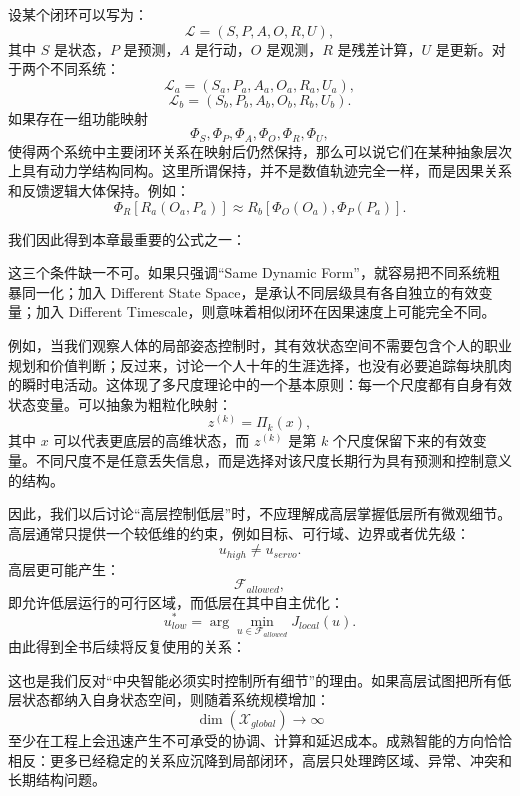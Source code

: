 设某个闭环可以写为：
\[
\mathcal{L}
=
(S,P,A,O,R,U),
\]
其中 $S$ 是状态，$P$ 是预测，$A$ 是行动，$O$ 是观测，$R$ 是残差计算，$U$ 是更新。对于两个不同系统：
\[
\mathcal{L}_a
=
(S_a,P_a,A_a,O_a,R_a,U_a),
\]
\[
\mathcal{L}_b
=
(S_b,P_b,A_b,O_b,R_b,U_b).
\]
如果存在一组功能映射
\[
\Phi_S,\Phi_P,\Phi_A,\Phi_O,\Phi_R,\Phi_U,
\]
使得两个系统中主要闭环关系在映射后仍然保持，那么可以说它们在某种抽象层次上具有动力学结构同构。这里所谓保持，并不是数值轨迹完全一样，而是因果关系和反馈逻辑大体保持。例如：
\[
\Phi_R
\left[
R_a(O_a,P_a)
\right]
\approx
R_b
\left[
\Phi_O(O_a),
\Phi_P(P_a)
\right].
\]

我们因此得到本章最重要的公式之一：
\begin{statementbox}
\centering
{}
\end{statementbox}
这三个条件缺一不可。如果只强调“Same Dynamic Form”，就容易把不同系统粗暴同一化；加入 Different State Space，是承认不同层级具有各自独立的有效变量；加入 Different Timescale，则意味着相似闭环在因果速度上可能完全不同。

例如，当我们观察人体的局部姿态控制时，其有效状态空间不需要包含个人的职业规划和价值判断；反过来，讨论一个人十年的生涯选择，也没有必要追踪每块肌肉的瞬时电活动。这体现了多尺度理论中的一个基本原则：每一个尺度都有自身有效状态变量。可以抽象为粗粒化映射：
\[
z^{(k)}
=
\Pi_k(x),
\]
其中 $x$ 可以代表更底层的高维状态，而 $z^{(k)}$ 是第 $k$ 个尺度保留下来的有效变量。不同尺度不是任意丢失信息，而是选择对该尺度长期行为具有预测和控制意义的结构。

因此，我们以后讨论“高层控制低层”时，不应理解成高层掌握低层所有微观细节。高层通常只提供一个较低维的约束，例如目标、可行域、边界或者优先级：
\[
u_{high}
\neq
u_{servo}.
\]
高层更可能产生：
\[
\mathcal{F}_{allowed},
\]
即允许低层运行的可行区域，而低层在其中自主优化：
\[
u_{low}^{*}
=
\arg\min_{u\in\mathcal{F}_{allowed}}
J_{local}(u).
\]
由此得到全书后续将反复使用的关系：
\begin{statementbox}
\centering
{}
\end{statementbox}

这也是我们反对“中央智能必须实时控制所有细节”的理由。如果高层试图把所有低层状态都纳入自身状态空间，则随着系统规模增加：
\[
\dim(\mathcal{X}_{global})
\rightarrow
\infty
\]
至少在工程上会迅速产生不可承受的协调、计算和延迟成本。成熟智能的方向恰恰相反：更多已经稳定的关系应沉降到局部闭环，高层只处理跨区域、异常、冲突和长期结构问题。

